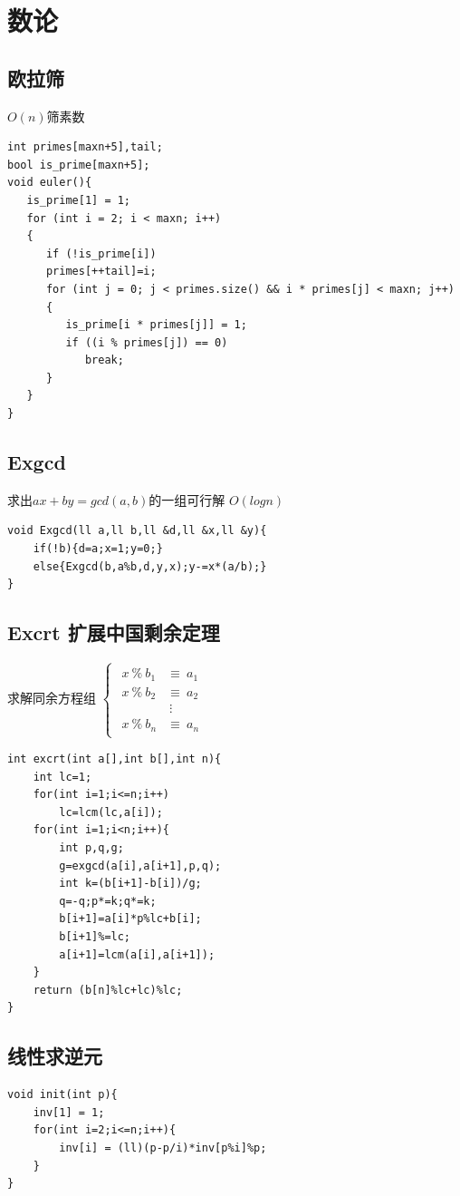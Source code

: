\documentclass[a4]{ctexart}
\begin{document}
\section{数论}

\subsection{欧拉筛}
$O(n)$筛素数
\begin{lstlisting}
int primes[maxn+5],tail;
bool is_prime[maxn+5];
void euler(){
   is_prime[1] = 1;
   for (int i = 2; i < maxn; i++)
   {
      if (!is_prime[i])
      primes[++tail]=i;
      for (int j = 0; j < primes.size() && i * primes[j] < maxn; j++)
      {
         is_prime[i * primes[j]] = 1;
         if ((i % primes[j]) == 0)
            break;
      }
   }
}
\end{lstlisting}

\subsection{Exgcd}
求出$ax+by=gcd(a,b)$的一组可行解 $O(logn)$ 
\begin{lstlisting}
void Exgcd(ll a,ll b,ll &d,ll &x,ll &y){
	if(!b){d=a;x=1;y=0;}
	else{Exgcd(b,a%b,d,y,x);y-=x*(a/b);}
}
\end{lstlisting}

\subsection{Excrt 扩展中国剩余定理}
求解同余方程组
$\begin{cases}
	\begin{aligned}
	x \ \% \ b_1  &\equiv \  a_1\\
	x \ \% \ b_2  &\equiv \ a_2\\
	           		& \ \vdots   \\
	x \ \% \ b_n  &\equiv  \ a_n
	\end{aligned}
\end{cases}$
\begin{lstlisting}
int excrt(int a[],int b[],int n){
    int lc=1;
    for(int i=1;i<=n;i++)
        lc=lcm(lc,a[i]);
    for(int i=1;i<n;i++){
        int p,q,g;
        g=exgcd(a[i],a[i+1],p,q);
        int k=(b[i+1]-b[i])/g;
        q=-q;p*=k;q*=k;
        b[i+1]=a[i]*p%lc+b[i];
        b[i+1]%=lc;
        a[i+1]=lcm(a[i],a[i+1]);
    }
    return (b[n]%lc+lc)%lc;
}
\end{lstlisting}

\subsection{线性求逆元}
\begin{lstlisting}
void init(int p){
	inv[1] = 1;
	for(int i=2;i<=n;i++){
		inv[i] = (ll)(p-p/i)*inv[p%i]%p;
	}
}
\end{lstlisting}
\end{document}
